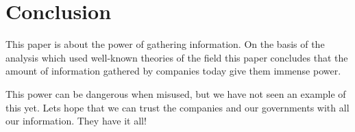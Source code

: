 \section{Conclusion}
This paper is about the power of gathering information. On the basis of the analysis which used well-known theories of the field this paper concludes that the amount of information gathered by companies today give them immense power.

This power can be dangerous when misused, but we have not seen an example of this yet. Lets hope that we can trust the companies and our governments with all our information. They have it all!
